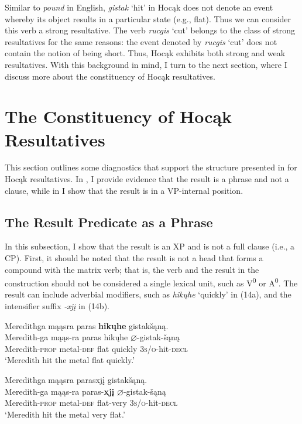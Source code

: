 \documentclass[output=paper]{LSP/langsci}
\begin{document}
Similar to \textit{pound} in English, \textit{gistak} `hit' in Hocąk does not denote an event whereby its object results in a particular state (e.g., flat). Thus we can consider this verb a strong resultative. The verb \textit{rucgis} `cut' belongs to the class of strong resultatives for the same reasons: the event denoted by \textit{rucgis} `cut' does not contain the notion of being short. Thus, Hocąk exhibits both strong and weak resultatives. With this background in mind, I turn to the next section, where I discuss more about the constituency of Hocąk resultatives.

\section{The Constituency of Hocąk Resultatives}\label{sec:rosen:3}

This section outlines some diagnostics that support the structure presented in  for Hocąk resultatives. In , I provide evidence that the result is a phrase and not a clause, while in  I show that the result is in a VP-internal position.

\subsection{The Result Predicate as a Phrase}\label{sec:rosen:3.1}

In this subsection, I show that the result is an XP and is not a full clause (i.e., a CP). First, it should be noted that the result is not a head that forms a compound with the matrix verb; that is, the verb and the result in the construction should not be considered a single lexical unit, such as V\textsuperscript{0} or A\textsuperscript{0}. The result can include adverbial modifiers, such as \textit{hikųhe} `quickly' in (14a), and the intensifier suffix \textit{-xjį} in (14b).

\begin{exe}
\ex\label{ex:rosen:14}
\begin{xlist}

\ex \glll Meredithga mąąsra paras \textbf{hikųhe} gistakšąną. \\
 Meredith-ga mąąs-ra paras hikųhe {$\varnothing$}-gistak-šąną\\
Meredith-\textsc{prop} metal-\textsc{def} flat quickly \textsc{3s/o}-hit-\textsc{decl}\\ 
\glt `Meredith hit the metal flat quickly.'


\ex \glll Meredithga mąąsra parasxjį gistakšąną.\\
 Meredith-ga mąąs-ra paras-\textbf{xjį} {$\varnothing$}-gistak-šąną\\
Meredith-\textsc{prop} metal-\textsc{def} flat-very  \textsc{3s/o}-hit-\textsc{decl}\\
\glt `Meredith hit the metal very flat.'

\end{xlist}
\end{exe}
\end{document}

